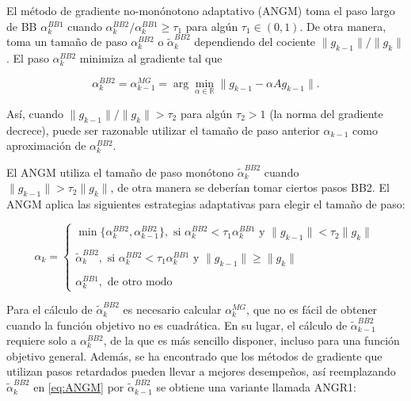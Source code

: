 El método de gradiente no-monónotono adaptativo (ANGM) toma el paso largo de BB $\alpha_k^{BB1}$ cuando $\alpha_k^{BB2}/\alpha_k^{BB1}\geq \tau_1$ para algún $\tau_1\in(0,1)$. De otra manera, toma un tamaño de paso $\alpha_k^{BB2}$ o $\tilde{\alpha}_k^{BB2}$ dependiendo del cociente $\|g_{k-1}\|/\|g_k\|$. El paso $\alpha_k^{BB2}$ minimiza al gradiente tal que

\begin{equation*}
    \alpha_k^{BB2}=\alpha_{k-1}^{MG} =\arg\min_{\alpha\in\mathbb{R}}{\|g_{k-1}-\alpha Ag_{k-1}\|}.
\end{equation*}

Así, cuando $\|g_{k-1}\|/\|g_k\|>\tau_2$ para algún $\tau_2>1$ (la norma del gradiente decrece), puede ser razonable  utilizar el tamaño de paso anterior $\alpha_{k-1}$ como aproximación de $\alpha_k^{BB2}$.

El ANGM utiliza el tamaño de paso monótono $\tilde{\alpha}_k^{BB2}$ cuando $\|g_{k-1}\|>\tau_2\|g_k\|$, de otra manera se deberían tomar ciertos pasos BB2.
El ANGM aplica las siguientes estrategias adaptativas para elegir el tamaño de paso:

\begin{equation}
    \alpha_k =\begin{cases} \min\{\alpha_k^{BB2}, \alpha_{k-1}^{BB2}\}, \text{ \ si \ } \alpha_k^{BB2}<\tau_1\alpha_k^{BB1}\text{ \ y \ } \|g_{k-1}\|<\tau_2\|g_k\| \\\\
        \tilde{\alpha}_k^{BB2}, \text{ \ si \ } \alpha_k^{BB2} < \tau_1\alpha_k^{BB1} \text{ \ y \ } \|g_{k-1}\|\geq \|g_k\|                    \\\\
        \alpha_k^{BB1}, \text{ \ de otro modo \ }
    \end{cases}
    \label{eq:ANGM}
\end{equation}

Para el cálculo de $\tilde{\alpha}_k^{BB2}$ es necesario calcular $\alpha_k^{MG}$, que no es fácil de obtener cuando la función objetivo no es cuadrática. En su lugar, el cálculo de $\tilde{\alpha}_{k-1}^{BB2}$ requiere solo a $\alpha_k^{BB2} $, de la que es más sencillo disponer, incluso para una función objetivo general. Además, se ha encontrado que los métodos de gradiente que utilizan pasos retardados pueden llevar a mejores desempeños, así reemplazando $\tilde{\alpha}_k^{BB2}$ en \ref{eq:ANGM} por $\tilde{\alpha}_{k-1}^{BB2}$ se obtiene una variante llamada ANGR1:

